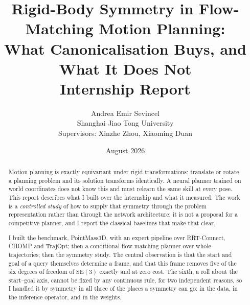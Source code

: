 \documentclass[11pt,a4paper]{article}
\title{Rigid-Body Symmetry in Flow-Matching Motion Planning:\\
       What Canonicalisation Buys, and What It Does Not\\[6pt]
       \large Internship Report}
\author{Andrea Emir Sevincel\\
        {\normalsize Shanghai Jiao Tong University}\\
        {\normalsize Supervisors: Xinzhe Zhou, Xiaoming Duan}}
\date{August 2026}
\newcommand{\SE}{\mathrm{SE}(3)}
\begin{document}
\maketitle

\begin{abstract}
\noindent
Motion planning is exactly equivariant under rigid transformations: translate or
rotate a planning problem and its solution transforms identically. A neural
planner trained on world coordinates does not know this and must relearn the
same skill at every pose. This report describes what I built over the internship
and what it measured. The work is a \emph{controlled study} of how to supply
that symmetry through the problem representation rather than through the network
architecture; it is not a proposal for a competitive planner, and I report the
classical baselines that make that clear.

I built the benchmark, PointMass3D, with an expert pipeline over RRT-Connect,
CHOMP and TrajOpt; then a conditional flow-matching planner over whole
trajectories; then the symmetry study. The central observation is that the start
and goal of a query themselves determine a frame, and that this frame removes
five of the six degrees of freedom of $\SE$ exactly and at zero cost. The sixth,
a roll about the start--goal axis, cannot be fixed by any continuous rule, for
two independent reasons, so I handled it by symmetry in all three of the places
a symmetry can go: in the data, in the inference operator, and in the weights.


\end{abstract}
\end{document}
